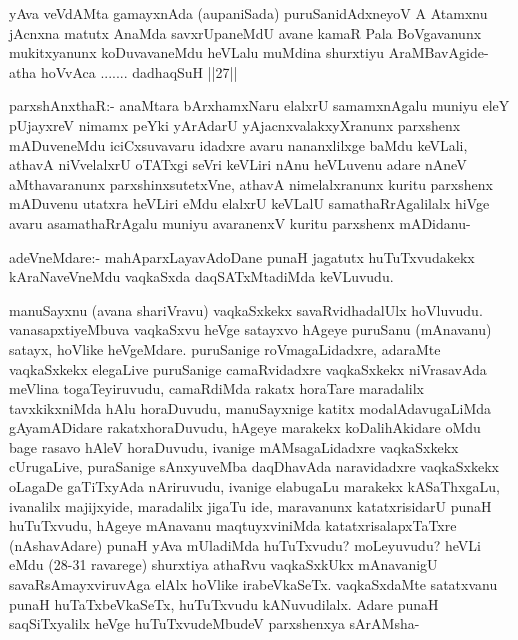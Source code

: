 \begin{artha}
yAva veVdAMta gamayxnAda (aupaniSada) puruSanidAdxneyoV A Atamxnu jAcnxna matutx AnaMda savxrUpaneMdU avane kamaR Pala BoVgavanunx mukitxyanunx koDuvavaneMdu heVLalu muMdina shurxtiyu AraMBavAgide- atha hoVvAca ....... dadhaqSuH ||27||
\end{artha}

\begin{artha}
parxshAnxthaR:- anaMtara bArxhamxNaru elalxrU samamxnAgalu muniyu eleY pUjayxreV nimamx peYki yArAdarU yAjacnxvalakxyXranunx parxshenx mADuveneMdu iciCxsuvavaru idadxre avaru nananxlilxge baMdu keVLali, athavA niVvelalxrU oTATxgi seVri keVLiri nAnu heVLuvenu adare nAneV aMthavaranunx parxshinxsutetxVne, athavA nimelalxranunx kuritu parxshenx mADuvenu utatxra heVLiri eMdu elalxrU keVLalU samathaRrAgalilalx hiVge avaru asamathaRrAgalu muniyu avaranenxV kuritu parxshenx mADidanu-
\end{artha}

\begin{artha}
adeVneMdare:- mahAparxLayavAdoDane punaH jagatutx huTuTxvudakekx kAraNaveVneMdu vaqkaSxda daqSATxMtadiMda keVLuvudu. 
\end{artha}

\begin{artha}
manuSayxnu (avana shariVravu) vaqkaSxkekx savaRvidhadalUlx hoVluvudu. vanasapxtiyeMbuva vaqkaSxvu heVge satayxvo hAgeye puruSanu (mAnavanu) satayx, hoVlike heVgeMdare. puruSanige roVmagaLidadxre, adaraMte vaqkaSxkekx elegaLive puruSanige camaRvidadxre vaqkaSxkekx niVrasavAda meVlina togaTeyiruvudu, camaRdiMda rakatx horaTare maradalilx tavxkikxniMda hAlu horaDuvudu, manuSayxnige katitx modalAdavugaLiMda gAyamADidare rakatxhoraDuvudu, hAgeye marakekx koDalihAkidare oMdu bage rasavo hAleV horaDuvudu, ivanige mAMsagaLidadxre vaqkaSxkekx cUrugaLive, puraSanige sAnxyuveMba daqDhavAda naravidadxre vaqkaSxkekx oLagaDe gaTiTxyAda nAriruvudu, ivanige elabugaLu marakekx kASaThxgaLu, ivanalilx majijxyide, maradalilx jigaTu ide, maravanunx katatxrisidarU punaH huTuTxvudu, hAgeye mAnavanu maqtuyxviniMda katatxrisalapxTaTxre (nAshavAdare) punaH yAva mUladiMda huTuTxvudu? moLeyuvudu? heVLi eMdu (28-31 ravarege) shurxtiya athaRvu vaqkaSxkUkx mAnavanigU savaRsAmayxviruvAga elAlx hoVlike irabeVkaSeTx. vaqkaSxdaMte satatxvanu punaH huTaTxbeVkaSeTx, huTuTxvudu kANuvudilalx. Adare punaH saqSiTxyalilx heVge huTuTxvudeMbudeV parxshenxya sArAMsha-
\end{artha}%

